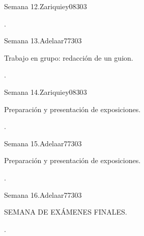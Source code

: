 \begin{syllabus}
\begin{unit}{Semana 12.}{}{Zariquiey08}{30}{3}
   \begin{learningoutcomes}
      \item .
   \end{learningoutcomes}
\end{unit}

\begin{unit}{Semana 13.}{}{Adelaar77}{30}{3}
   \begin{topics}
      \item Trabajo en grupo: redacción de un guion.
   \end{topics}

   \begin{learningoutcomes}
      \item .
   \end{learningoutcomes}
\end{unit}

\begin{unit}{Semana 14.}{}{Zariquiey08}{30}{3}
   \begin{topics}
      \item Preparación y presentación de exposiciones.
   \end{topics}

   \begin{learningoutcomes}
      \item .
   \end{learningoutcomes}
\end{unit}

\begin{unit}{Semana 15.}{}{Adelaar77}{30}{3}
   \begin{topics}
      \item Preparación y presentación de exposiciones.
   \end{topics}

   \begin{learningoutcomes}
      \item .
   \end{learningoutcomes}
\end{unit}

\begin{unit}{Semana 16.}{}{Adelaar77}{30}{3}
   \begin{topics}
      \item SEMANA DE EXÁMENES FINALES.
   \end{topics}

   \begin{learningoutcomes}
      \item .
   \end{learningoutcomes}
\end{unit}



\begin{coursebibliography}
\end{coursebibliography}

\end{syllabus}
